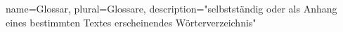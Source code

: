 {
    name=Glossar,
    plural=Glossare,
    description={"selbstständig oder als Anhang eines bestimmten Textes erscheinendes Wörterverzeichnis"}
}